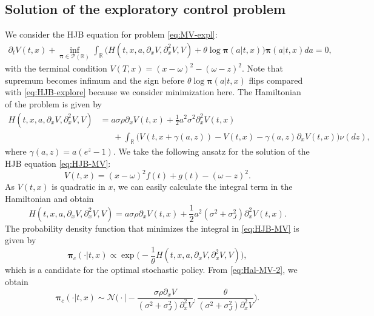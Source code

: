 \documentclass[11pt]{article}
\newcommand{\1}{\mathbbm{1}}
\newcommand{\bpi}{\boldsymbol{\pi}}
\begin{document}
\subsection{Solution of the exploratory control problem}
We consider the HJB equation for problem \eqref{eq:MV-expl}:
\begin{align}
	\partial_t V(t,x) +   \inf_{ \boldsymbol{\pi} \in \mathcal{P} (\mathbb{R})}\int_{\mathbb{R}} \big( H(t,x, a, \partial_xV, \partial_{x}^2V, V) + \theta \log \bpi(a | t, x)\big) \bpi(a | t, x) da = 0 \label{eq:HJB-MV},
\end{align}
with the terminal condition $V(T, x) = (x-\omega)^2 - (\omega-z)^2$. Note that  supremum becomes infimum and the sign before $\theta\log\bpi(a | t, x)$ flips compared with \eqref{eq:HJB-explore} because we consider minimization here. The Hamiltonian of the problem is given by
\begin{align}
	H(t,x, a, \partial_xV,  \partial_{x}^2V, V)&= a\sigma\rho \partial_xV(t,x) + \frac{1}{2} a^2\sigma^2 \partial_x^2V(t,x)\\
	&\phantom{=~}+\int_{\mathbb{R}} \big( V(t, x+  \gamma(a, z)) - V(t,x) - \gamma(a,z)\partial_xV(t,x) \big) \nu(dz),\label{eq:Hal-MV}
\end{align}
where $\gamma(a, z)= a(e^z-1).$
We take the following ansatz for the solution of the HJB equation \eqref{eq:HJB-MV}:
\begin{equation}\label{eq:ansatz-MV}
	V(t,x)=(x-\omega)^2 f(t) + g(t) - (\omega-z)^2.
\end{equation}
As $V(t,x)$ is quadratic in $x$, we can easily calculate the integral term in the Hamiltonian and obtain
\begin{equation}
	H(t,x, a, \partial_xV,  \partial_x^2V, V)= a\sigma\rho \partial_xV(t,x) + \frac{1}{2} a^2(\sigma^2 + \sigma_J^2) \partial_x^2V(t,x).\label{eq:Hal-MV-2}
\end{equation}
The probability density function that minimizes the integral in \eqref{eq:HJB-MV} is given by
\begin{equation}
	\bpi_c(\cdot|t,x)\propto \exp \Big(-\frac{1}{\theta} H(t,x, a, \partial_xV,  \partial_{x}^2V, V)  \Big),
\end{equation}
which is a candidate for the optimal stochastic policy.
From \eqref{eq:Hal-MV-2}, we obtain
\begin{equation}
\bpi_c(\cdot|t,x)\sim\mathcal{N}\Big(\cdot \Big| -\frac{\sigma\rho \partial_xV}{(\sigma^2+\sigma_J^2)\partial_x^2V}, \frac{\theta}{(\sigma^2+\sigma_J^2)\partial_x^2V}\Big).
\end{equation}
\end{document}
